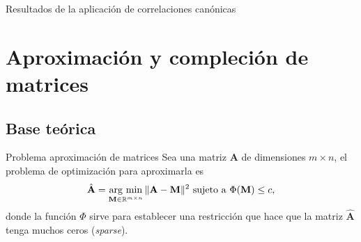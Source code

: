 \documentclass{beamer}
\newcommand{\argmin}{\operatornamewithlimits{arg\ min}}
\begin{document}
\begin{frame}{Resultados de la aplicación de correlaciones canónicas}
\centering
{}
\end{frame}


\section{Aproximación y compleción de matrices}
\subsection{Base teórica}
\begin{frame}{Problema aproximación de matrices}
Sea una matriz $\mathbf{A}$ de dimensiones $m \times n$, el problema de optimización para aproximarla es
\begin{equation*}
    \hat{\mathbf{A}} =\argmin_{\mathbf{M} \in \mathbb{R}^{m \times n}} \| \mathbf{A} - \mathbf{M} \|^2 \mathrm{\ sujeto\ a\ }\Phi(\mathbf{M}) \leq c,
\end{equation*}
donde la función $\Phi$ sirve para establecer una restricción que hace que la matriz $\hat{\mathbf{A}}$ tenga muchos ceros (\textit{sparse}).
\end{frame}
\end{document}
